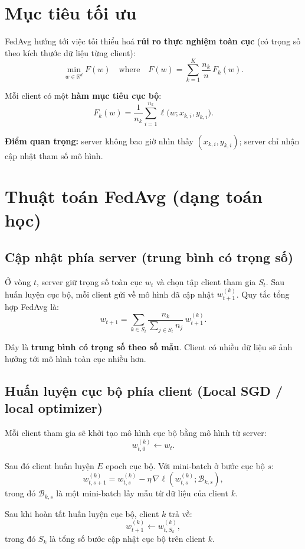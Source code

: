 \documentclass[12pt,a4paper]{article}
\begin{document}
\section{Mục tiêu tối ưu}

FedAvg hướng tới việc tối thiểu hoá \textbf{rủi ro thực nghiệm toàn cục} (có trọng số theo kích thước dữ liệu từng client):
\[
\min_{w \in \mathbb{R}^d} F(w) \quad \text{where} \quad
F(w) = \sum_{k=1}^{K} \frac{n_k}{n}\,F_k(w).
\]

Mỗi client có một \textbf{hàm mục tiêu cục bộ}:
\[
F_k(w) = \frac{1}{n_k}\sum_{i=1}^{n_k} \ell\bigl(w; x_{k,i}, y_{k,i}\bigr).
\]

\textbf{Điểm quan trọng:} server không bao giờ nhìn thấy $(x_{k,i}, y_{k,i})$; server chỉ nhận cập nhật tham số mô hình.

\section{Thuật toán FedAvg (dạng toán học)}

\subsection{Cập nhật phía server (trung bình có trọng số)}

Ở vòng $t$, server giữ trọng số toàn cục $w_t$ và chọn tập client tham gia $S_t$.
Sau huấn luyện cục bộ, mỗi client gửi về mô hình đã cập nhật $w_{t+1}^{(k)}$.
Quy tắc tổng hợp FedAvg là:
\[
w_{t+1} = \sum_{k \in S_t} \frac{n_k}{\sum_{j \in S_t} n_j}\, w_{t+1}^{(k)}.
\]

Đây là \textbf{trung bình có trọng số theo số mẫu}. Client có nhiều dữ liệu sẽ ảnh hưởng tới mô hình toàn cục nhiều hơn.

\subsection{Huấn luyện cục bộ phía client (Local SGD / local optimizer)}

Mỗi client tham gia sẽ khởi tạo mô hình cục bộ bằng mô hình từ server:
\[
w_{t,0}^{(k)} \leftarrow w_t.
\]

Sau đó client huấn luyện $E$ epoch cục bộ. Với mini-batch ở bước cục bộ $s$:
\[
w_{t,s+1}^{(k)} = w_{t,s}^{(k)} - \eta \,\nabla \ell\left(w_{t,s}^{(k)}; \mathcal{B}_{k,s}\right),
\]
trong đó $\mathcal{B}_{k,s}$ là một mini-batch lấy mẫu từ dữ liệu của client $k$.

Sau khi hoàn tất huấn luyện cục bộ, client $k$ trả về:
\[
w_{t+1}^{(k)} \leftarrow w_{t,S_k}^{(k)},
\]
trong đó $S_k$ là tổng số bước cập nhật cục bộ trên client $k$.
\end{document}
